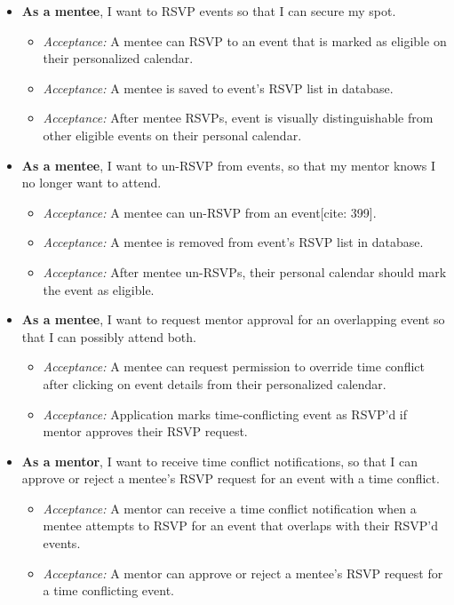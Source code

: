 \begin{itemize}[leftmargin=*, label=$\square$]
    \item \textbf{As a mentee}, I want to RSVP events so that I can secure my
    spot.
    \begin{itemize}[label=$\circ$, nosep]
        \item \textit{Acceptance:} A mentee can RSVP to an event that is marked
        as eligible on their personalized calendar.
        \item \textit{Acceptance:} A mentee is saved to event's RSVP list in
        database.
        \item \textit{Acceptance:} After mentee RSVPs, event is visually
        distinguishable from other eligible events on their personal
        calendar.
    \end{itemize}

    \item \textbf{As a mentee}, I want to un-RSVP from events, so that my mentor
    knows I no longer want to attend.
    \begin{itemize}[label=$\circ$, nosep]
        \item \textit{Acceptance:} A mentee can un-RSVP from an event[cite:
        399].
        \item \textit{Acceptance:} A mentee is removed from event's RSVP list in
        database.
        \item \textit{Acceptance:} After mentee un-RSVPs, their personal
        calendar should mark the event as eligible.
    \end{itemize}

    \item \textbf{As a mentee}, I want to request mentor approval for an
    overlapping event so that I can possibly attend both.
    \begin{itemize}[label=$\circ$, nosep]
        \item \textit{Acceptance:} A mentee can request permission to override
        time conflict after clicking on event details from their personalized
        calendar.
        \item \textit{Acceptance:} Application marks time-conflicting event as
        RSVP'd if mentor approves their RSVP request.
    \end{itemize}

    \item \textbf{As a mentor}, I want to receive time conflict notifications,
    so that I can approve or reject a mentee's RSVP request for an event with a
    time conflict.
    \begin{itemize}[label=$\circ$, nosep]
        \item \textit{Acceptance:} A mentor can receive a time conflict
        notification when a mentee attempts to RSVP for an event that overlaps
        with their RSVP'd events.
        \item \textit{Acceptance:} A mentor can approve or reject a mentee's
        RSVP request for a time conflicting event.
    \end{itemize}
\end{itemize}
